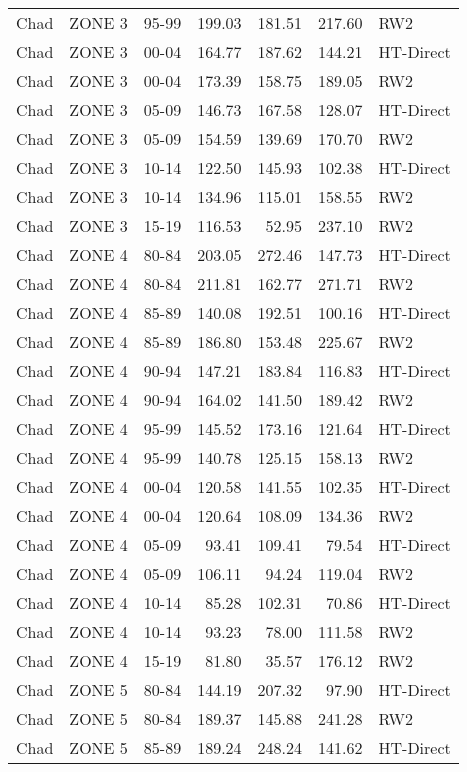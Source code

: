 \begin{longtable}{lllrrrl}
  Chad & ZONE 3 & 95-99 & 199.03 & 181.51 & 217.60 & RW2 \\ 
  Chad & ZONE 3 & 00-04 & 164.77 & 187.62 & 144.21 & HT-Direct \\ 
  Chad & ZONE 3 & 00-04 & 173.39 & 158.75 & 189.05 & RW2 \\ 
  Chad & ZONE 3 & 05-09 & 146.73 & 167.58 & 128.07 & HT-Direct \\ 
  Chad & ZONE 3 & 05-09 & 154.59 & 139.69 & 170.70 & RW2 \\ 
  Chad & ZONE 3 & 10-14 & 122.50 & 145.93 & 102.38 & HT-Direct \\ 
  Chad & ZONE 3 & 10-14 & 134.96 & 115.01 & 158.55 & RW2 \\ 
  Chad & ZONE 3 & 15-19 & 116.53 & 52.95 & 237.10 & RW2 \\ 
  Chad & ZONE 4 & 80-84 & 203.05 & 272.46 & 147.73 & HT-Direct \\ 
  Chad & ZONE 4 & 80-84 & 211.81 & 162.77 & 271.71 & RW2 \\ 
  Chad & ZONE 4 & 85-89 & 140.08 & 192.51 & 100.16 & HT-Direct \\ 
  Chad & ZONE 4 & 85-89 & 186.80 & 153.48 & 225.67 & RW2 \\ 
  Chad & ZONE 4 & 90-94 & 147.21 & 183.84 & 116.83 & HT-Direct \\ 
  Chad & ZONE 4 & 90-94 & 164.02 & 141.50 & 189.42 & RW2 \\ 
  Chad & ZONE 4 & 95-99 & 145.52 & 173.16 & 121.64 & HT-Direct \\ 
  Chad & ZONE 4 & 95-99 & 140.78 & 125.15 & 158.13 & RW2 \\ 
  Chad & ZONE 4 & 00-04 & 120.58 & 141.55 & 102.35 & HT-Direct \\ 
  Chad & ZONE 4 & 00-04 & 120.64 & 108.09 & 134.36 & RW2 \\ 
  Chad & ZONE 4 & 05-09 & 93.41 & 109.41 & 79.54 & HT-Direct \\ 
  Chad & ZONE 4 & 05-09 & 106.11 & 94.24 & 119.04 & RW2 \\ 
  Chad & ZONE 4 & 10-14 & 85.28 & 102.31 & 70.86 & HT-Direct \\ 
  Chad & ZONE 4 & 10-14 & 93.23 & 78.00 & 111.58 & RW2 \\ 
  Chad & ZONE 4 & 15-19 & 81.80 & 35.57 & 176.12 & RW2 \\ 
  Chad & ZONE 5 & 80-84 & 144.19 & 207.32 & 97.90 & HT-Direct \\ 
  Chad & ZONE 5 & 80-84 & 189.37 & 145.88 & 241.28 & RW2 \\ 
  Chad & ZONE 5 & 85-89 & 189.24 & 248.24 & 141.62 & HT-Direct \\ 

\end{longtable}
